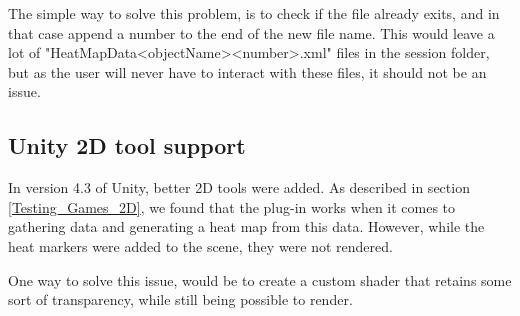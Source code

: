 The simple way to solve this problem, is to check if the file already exits, and in that case append a number to the end of the new file name. This would leave a lot of "HeatMapData<objectName><number>.xml" files in the session folder, but as the user will never have to interact with these files, it should not be an issue.

\subsection{Unity 2D tool support}
\label{Issues_2DSupport}

In version 4.3 of Unity, better 2D tools were added. As described in section \ref{Testing_Games_2D}, we found that the plug-in works when it comes to gathering data and generating a heat map from this data. However, while the heat markers were added to the scene, they were not rendered.

One way to solve this issue, would be to create a custom shader that retains some sort of transparency, while still being possible to render.